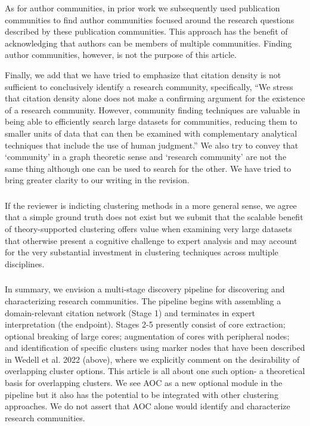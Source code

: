 \documentclass[11pt, oneside]{article}   	%
\begin{document}
As for author communities, in prior work we subsequently used publication communities \cite{Chandrasekharan2021,Wedell2022} to find author communities focused around the research questions described by these publication communities.  This approach has the benefit of acknowledging that authors can be members of multiple communities.  Finding author communities, however, is not the purpose of this article. 

Finally, we add that we have tried to emphasize that citation density is not sufficient to conclusively identify a research community, specifically, ``We stress that citation density alone does not make a confirming argument for the existence of a research community. However, community finding techniques are valuable in being able to efficiently search large datasets for communities, reducing them to smaller units of data that can then be examined with complementary analytical techniques that include the use of human judgment.'' We also try to convey that `community' in a graph theoretic sense and `research community' are not the same thing although one can be used to search for the other.  We have tried to bring greater clarity to our writing in the revision. 

\subsubsection{} If the reviewer is indicting clustering methods in a more general sense, we agree that a simple ground truth does not exist but we submit that the scalable benefit of theory-supported clustering offers value when examining very large datasets that otherwise present a cognitive challenge to expert analysis and may account for the very substantial investment in clustering techniques across multiple disciplines. 


\subsubsection{}

In summary, we envision a multi-stage discovery pipeline for discovering and characterizing research communities. The pipeline begins with assembling a domain-relevant citation network (Stage 1) and terminates in expert interpretation (the endpoint). Stages 2-5 presently consist of core extraction; optional breaking of large cores; augmentation of cores with peripheral nodes; and identification of specific clusters using marker nodes that have been described in Wedell et al. 2022 (above), where we explicitly comment on the desirability of overlapping cluster options. This article is all about one such option- a theoretical basis for overlapping clusters. We see AOC as a new optional module in the pipeline but it also has the potential to be integrated with other clustering approaches. We do not assert that AOC alone would identify and characterize research communities.
\end{document}
